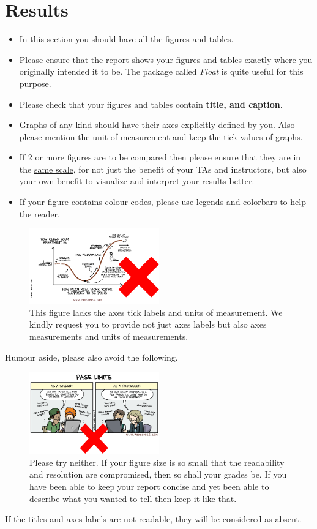 \documentclass[a4paper]{article}
\begin{document}
\section{Results}
\begin{itemize}
 \item In this section you should have all the figures and tables.
 \item Please ensure that the report shows your figures and tables exactly where you originally intended it to be. 
 The package called \textit{Float} is quite useful for this purpose. 
 \item Please check that your figures and tables contain \textbf{title, and caption}.
 \item Graphs of any kind should have their axes explicitly defined by you.  Also please mention the unit of measurement and keep the tick values of graphs.
 \item If 2 or more figures are to be compared then please ensure that they are in the \underline{same scale}, for not just the benefit of your TAs and instructors, but
 also your own benefit to visualize and interpret your results better.
 \item If your figure contains colour codes, please use \underline{legends} and \underline{colorbars} to help the reader.
\end{itemize}
\begin{figure}[H]
\centering
   \includegraphics[width=0.5\textwidth]{workClean.png}
   \caption{This figure lacks the axes tick labels and units of measurement. We kindly request you to provide not just axes labels but also axes measurements and units of measurements.}
   \label{fig:noTicks}
\end{figure}
Humour aside, please also avoid the following.
\begin{figure}[H]
\centering
   \includegraphics[width=0.5\textwidth]{pageLimit.png}
   \caption{Please try neither. If your figure size is so small that the readability and resolution are compromised, then so shall your grades be. If you have been able to keep your report concise
   and yet been able to describe what you wanted to tell then keep it like that.}
   \label{fig:PageLimit}
\end{figure}
If the titles and axes labels are not readable, they will be considered as absent. 
\end{document}
